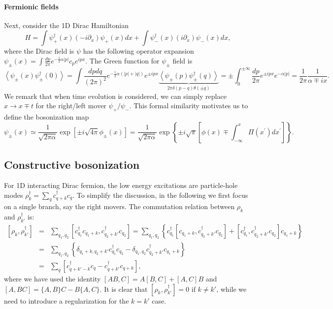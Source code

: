 \documentclass[aps,prb,superscriptaddress,nofootinbib]{revtex4}
\begin{document}
\paragraph*{Fermionic fields}
Next, consider the 1D Dirac Hamiltonian 
\begin{equation*}
	H = \int \psi_+^\dagger(x)(-i\partial_x)\psi_+(x) dx + \int \psi_-^\dagger(x)(i\partial_x)\psi_-(x) dx,
\end{equation*}
where the Dirac field is $\psi$ has the following operator expansion 
$\psi_\pm(x) = \int \frac{dp}{2\pi} e^{-\frac{1}{2}\alpha|p|}c_p e^{ipx}$.
The Green function for $\psi_\pm$ field is
\begin{equation*}
	\left\langle\psi_{\pm}(x) \psi_{\pm}^{\dagger}(0)\right\rangle 
	= \int \frac{d p dq}{(2 \pi)^2} e^{-\frac{1}{2} \alpha(|p|+|q|)} e^{\pm i p x} \underbrace{\left\langle\psi_{\pm}(p) \psi_{\pm}^{\dagger}(q)\right\rangle}_{2 \pi \delta(p-q) \theta(\pm q)} 
	= \pm\int_0^{\pm \infty} \frac{d p}{2 \pi} e^{\pm i p x} e^{-\alpha|p|}
	= \frac{1}{2\pi} \frac{1}{\alpha \mp ix}.
\end{equation*}
We remark that when time evolution is considered, we can simply replace $x \rightarrow x \mp t$ for the right/left mover $\psi_+/\psi_-$.
This formal similarity motivates us to define the bosonization map
\begin{equation}\label{eq:bosonization}
	\psi_\pm(x) \simeq \frac{1}{\sqrt{2\pi\alpha}} \exp\left[\pm i\sqrt{4\pi}\phi_\pm(x)\right]
	=\frac{1}{\sqrt{2 \pi \alpha}} \exp \left\{\pm i \sqrt{\pi}\left[\phi(x) \mp \int_{-\infty}^x \Pi\left(x^{\prime}\right) d x^{\prime}\right]\right\}.
\end{equation}



\subsection{Constructive bosonization}

For 1D interacting Dirac fermion, the low energy excitations are particle-hole modes $\rho_{k}^\dagger = \sum_{q} c_{q+k}^\dagger c_{q}$.
To simplify the discussion, in the following we first focus on a single branch, say the right movers.
The commutation relation between $\rho_k$ and $\rho_{k'}^\dagger$ is:
\begin{eqnarray}
	\left[\rho_{k}, \rho_{k'}^\dagger \right]
	&=& \sum_{q_1, q_2} \left[c_{q_1}^\dagger c_{q_1+k}, c_{q_2+k'}^\dagger c_{q_2}\right] 
	= \sum_{q_1, q_2} \left\{c_{q_1}^\dagger \left[c_{q_1+k}, c_{q_2+k'}^\dagger c_{q_2}\right] +\left[c_{q_1}^\dagger, c_{q_2+k'}^\dagger c_{q_2}\right] c_{q_1+k}\right\} \nonumber\\
	&=& \sum_{q_1, q_2} \left\{ \delta_{q_1+k,q_2+k'} c_{q_1}^\dagger c_{q_2} -
		\delta_{q_1,q_2} c_{q_2+k'}^\dagger c_{q_1+k} \right\} \nonumber \\
	&=& \sum_{q}\left[c^\dagger_{q+k'-k} c_{q}-c^\dagger_{q+k'} c_{q+k}\right] \label{eq:inf-subtraction},
\end{eqnarray}
where we have used the identity $[AB,C] = A[B,C] + [A,C]B$ and $[A,BC]=\{A,B\}C - B\{A,C\}$.
It is clear that $[\rho_{k},\rho_{k'}^\dagger]=0$ if $k \ne k'$, while we need to introduce a regularization for the $k=k'$ case.
\end{document}
